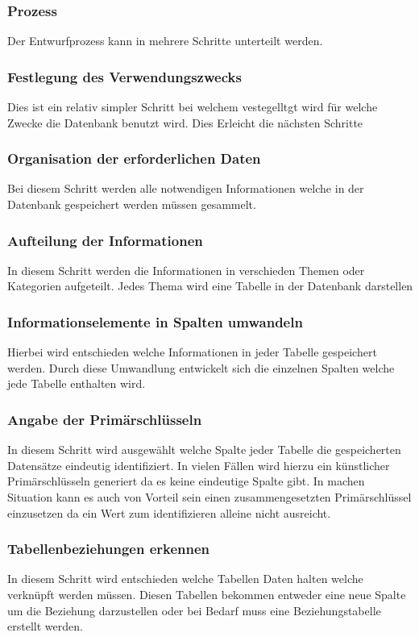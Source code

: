 			\subsubsection*{Prozess}
			Der Entwurfprozess kann in mehrere Schritte unterteilt werden.
			\subsubsection*{Festlegung des Verwendungszwecks}
				Dies ist ein relativ simpler Schritt bei welchem vestegelltgt wird für welche Zwecke die Datenbank benutzt wird. Dies Erleicht die nächsten Schritte
			\subsubsection*{Organisation der erforderlichen Daten}
				Bei diesem Schritt werden alle notwendigen Informationen welche in der Datenbank gespeichert werden müssen gesammelt.
			\subsubsection*{Aufteilung der Informationen}
				In diesem Schritt werden die Informationen in verschieden Themen oder Kategorien aufgeteilt. Jedes Thema wird eine Tabelle in der Datenbank darstellen
			\subsubsection*{Informationselemente in Spalten umwandeln}
				Hierbei wird entschieden welche Informationen in jeder Tabelle gespeichert werden. Durch diese Umwandlung entwickelt sich die einzelnen Spalten welche jede Tabelle enthalten wird.
			\subsubsection*{Angabe der Primärschlüsseln}
				In diesem Schritt wird ausgewählt welche Spalte jeder Tabelle die gespeicherten Datensätze eindeutig identifiziert. In vielen Fällen wird hierzu ein künstlicher Primärschlüsseln generiert da es keine eindeutige Spalte gibt. In machen Situation kann es auch von Vorteil sein einen zusammengesetzten Primärschlüssel einzusetzen da ein Wert zum identifizieren alleine nicht ausreicht.
			\subsubsection*{Tabellenbeziehungen erkennen}
				In diesem Schritt wird entschieden welche Tabellen Daten halten welche verknüpft werden müssen. Diesen Tabellen bekommen entweder eine neue Spalte um die Beziehung darzustellen oder bei Bedarf muss eine Beziehungstabelle erstellt werden.
